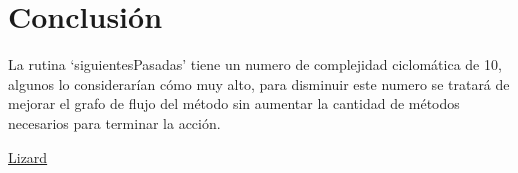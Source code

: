 \documentclass[conference]{IEEEtran}
\begin{document}
\section{Conclusión}

La rutina `siguientesPasadas' tiene un numero de complejidad ciclomática de 10, algunos lo considerarían cómo muy alto, para disminuir este numero se tratará de mejorar el grafo de flujo del método sin aumentar la cantidad de métodos necesarios para terminar la acción.

\begin{thebibliography}{1}
 \href{http://www.lizard.ws/}{Lizard}

\end{thebibliography}
\end{document}
